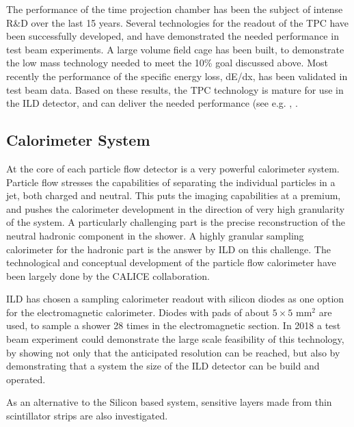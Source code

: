 \documentclass[%
 amsmath,amssymb,
 aps,
]{revtex4-1}
\begin{document}
The performance of the time projection chamber has been the subject of intense R\&D over the last 15 years. Several technologies for the readout of the TPC have been successfully developed, and have demonstrated the needed performance in test beam experiments. A large volume field cage has been built, to demonstrate the low mass technology needed to meet the 10\% goal discussed above. Most recently the performance of the specific energy loss, dE/dx, has been validated in test beam data. Based on these results, the TPC technology is mature for use in the ILD detector, and can deliver the needed performance (see e.g. \cite{Attie:2016yeu, Bouchez:2007pe}, . 


\subsection{Calorimeter System}
At the core of each particle flow detector is a very powerful calorimeter system. Particle flow stresses the capabilities of separating the individual particles in a jet, both charged and neutral. This puts the imaging capabilities at a premium, and pushes the calorimeter development in the direction of very high granularity of the system. A particularly challenging part is the precise reconstruction of the neutral hadronic component in the shower. A highly granular sampling calorimeter for the hadronic part is the answer by ILD on this challenge. The technological and conceptual development of the particle flow calorimeter have been largely done by the CALICE collaboration. 

ILD has chosen a sampling calorimeter readout with silicon diodes as one option for the electromagnetic calorimeter. Diodes with pads of about $5 \times 5$ mm$^2$ are used, to sample a shower 28 times in the electromagnetic section. In 2018 a test beam experiment could demonstrate the large scale feasibility of this technology, by showing not only that the anticipated resolution can be reached, but also by demonstrating that a system the size of the ILD detector can be build and operated. 

As an alternative to the Silicon based system, sensitive layers made from thin scintillator strips are also investigated. 
\end{document}
